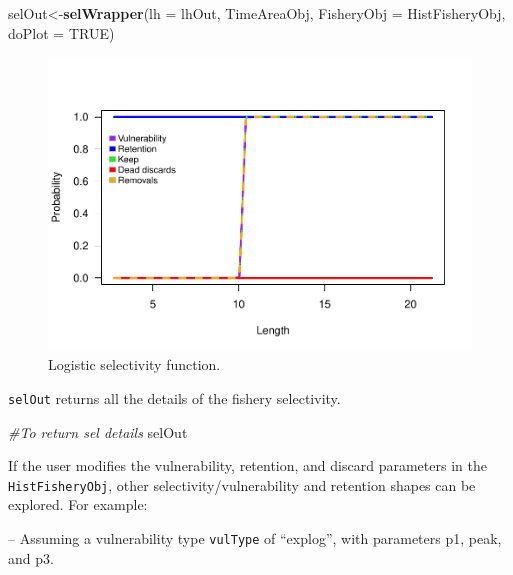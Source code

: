 \documentclass[
]{book}
\newenvironment{Shaded}{\begin{snugshade}}{\end{snugshade}}
\newcommand{\AttributeTok}[1]{\textcolor[rgb]{0.13,0.29,0.53}{#1}}
\newcommand{\CommentTok}[1]{\textcolor[rgb]{0.56,0.35,0.01}{\textit{#1}}}
\newcommand{\ConstantTok}[1]{\textcolor[rgb]{0.56,0.35,0.01}{#1}}
\newcommand{\FunctionTok}[1]{\textcolor[rgb]{0.13,0.29,0.53}{\textbf{#1}}}
\newcommand{\NormalTok}[1]{#1}
\newcommand{\OtherTok}[1]{\textcolor[rgb]{0.56,0.35,0.01}{#1}}
\begin{document}
\begin{Shaded}
\begin{Highlighting}[]
\NormalTok{selOut}\OtherTok{\textless{}{-}}\FunctionTok{selWrapper}\NormalTok{(}\AttributeTok{lh =}\NormalTok{ lhOut, TimeAreaObj, }\AttributeTok{FisheryObj =}\NormalTok{ HistFisheryObj, }\AttributeTok{doPlot =} \ConstantTok{TRUE}\NormalTok{)}
\end{Highlighting}
\end{Shaded}

\begin{figure}
\centering
\includegraphics{_main_files/figure-latex/sel-1.pdf}
\caption{\label{fig:sel}Logistic selectivity function.}
\end{figure}

\texttt{selOut} returns all the details of the fishery selectivity.

\begin{Shaded}
\begin{Highlighting}[]
\CommentTok{\#To return sel details}
\NormalTok{selOut}
\end{Highlighting}
\end{Shaded}

If the user modifies the vulnerability, retention, and discard parameters in the \texttt{HistFisheryObj}, other selectivity/vulnerability and retention shapes can be explored. For example:

-- Assuming a vulnerability type \texttt{vulType} of ``explog'', with parameters p1, peak, and p3.
\end{document}
